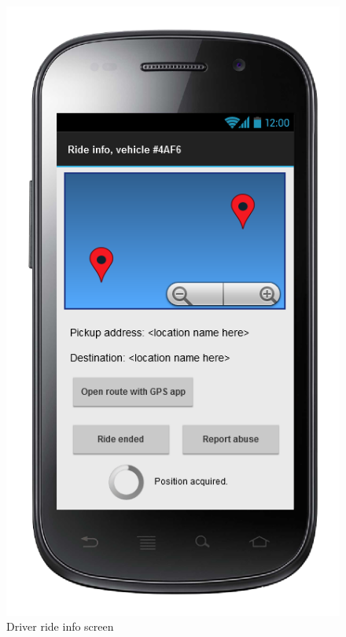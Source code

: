 \begin{center}
\begin{figure} [h]
  	  \includegraphics[scale=0.5]{ui/Driver ride info screen.png}
\caption{Driver ride info screen}
  
	\end{figure}
\end{center}

